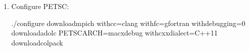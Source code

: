 \documentclass[a4paper,10pt,english]{sphinxmanual}
\begin{document}
\begin{enumerate}
\sphinxAtStartPar
and:

\begin{sphinxVerbatim}[commandchars=\\\{\}]
\PYGZdl{} export PETSC\PYGZus{}ARCH=macx\PYGZhy{}debug
\end{sphinxVerbatim}

\sphinxAtStartPar
{} that ‘adolc\sphinxhyphen{}utils’ folder is in the ‘build’ folder.

\item {} 
\sphinxAtStartPar
Configure PETSC:

\begin{sphinxVerbatim}[commandchars=\\\{\}]
\PYGZdl{} ./configure \PYGZhy{}\PYGZhy{}download\PYGZhy{}mpich \PYGZhy{}\PYGZhy{}with\PYGZhy{}cc=clang \PYGZhy{}\PYGZhy{}with\PYGZhy{}fc=gfortran \PYGZhy{}\PYGZhy{}with\PYGZhy{}debugging=0 \PYGZhy{}\PYGZhy{}download\PYGZhy{}adolc PETSC\PYGZus{}ARCH=macx\PYGZhy{}debug \PYGZhy{}\PYGZhy{}with\PYGZhy{}cxx\PYGZhy{}dialect=C++11 \PYGZhy{}\PYGZhy{}download\PYGZhy{}colpack
\end{sphinxVerbatim}

\end{enumerate}
\end{document}
